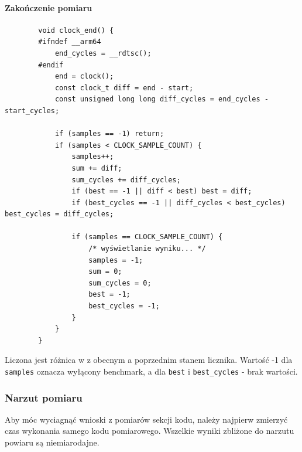 \documentclass{article}
\begin{document}
	\paragraph{Zakończenie pomiaru}
	\begin{verbatim}
		void clock_end() {
		#ifndef __arm64
			end_cycles = __rdtsc();
		#endif
			end = clock();
			const clock_t diff = end - start;
			const unsigned long long diff_cycles = end_cycles - start_cycles;
			
			if (samples == -1) return;
			if (samples < CLOCK_SAMPLE_COUNT) {
				samples++;
				sum += diff;
				sum_cycles += diff_cycles;
				if (best == -1 || diff < best) best = diff;
				if (best_cycles == -1 || diff_cycles < best_cycles) best_cycles = diff_cycles;
				
				if (samples == CLOCK_SAMPLE_COUNT) {
					/* wyświetlanie wyniku... */
					samples = -1;
					sum = 0;
					sum_cycles = 0;
					best = -1;
					best_cycles = -1;
				}
			}
		}
	\end{verbatim}
	Liczona jest różnica w z obecnym a poprzednim stanem licznika. Wartość -1 dla \verb|samples| oznacza wyłącony benchmark, a dla \verb|best| i \verb|best_cycles| - brak wartości.
	
	\subsubsection{Narzut pomiaru}
	Aby móc wyciagnąć wnioski z pomiarów sekcji kodu, należy najpierw zmierzyć czas wykonania samego kodu pomiarowego. Wszelkie wyniki zbliżone do narzutu powiaru są niemiarodajne.
	
\end{document}

